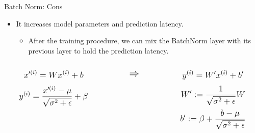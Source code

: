 \begin{frame}{Batch Norm: Cons}
	\begin{itemize}
		\item It increases model parameters and prediction latency.
		\medskip
		\begin{itemize}
			\item After the training procedure, we can mix the BatchNorm layer with its previous layer to hold the prediction latency.
		\end{itemize}
	\end{itemize}
	\begin{columns}
		\begin{column}[c]{0.45\textwidth}
			\centering
			\begin{equation*}
				\mathlarger{x'^{(i)} = W x^{(i)} + b}
			\end{equation*}
			\begin{equation*}
				\mathlarger{y^{(i)} = \frac{x'^{(i)} - \mu}{\sqrt{\sigma^2 + \epsilon}} + \beta}
			\end{equation*}
		\end{column}
		\begin{column}[c]{0.1\textwidth}
			\centering
			\begin{equation*}
				\mathlarger{\mathlarger{
				\Rightarrow
			}}
			\end{equation*}
		\end{column}
		\begin{column}[c]{0.45\textwidth}
			\centering
			\begin{equation*}
				\mathlarger{y^{(i)} = W' x^{(i)} + b'}
			\end{equation*}
			\begin{equation*}
				\mathlarger{
					W' := \frac{1}{\sqrt{\sigma^2 + \epsilon}} W	
				}
			\end{equation*}
			\begin{equation*}
				\mathlarger{
					b' := \beta + \frac{b- \mu}{\sqrt{\sigma^2 + \epsilon}}	
				}
			\end{equation*}
		\end{column}
	\end{columns}
\end{frame}